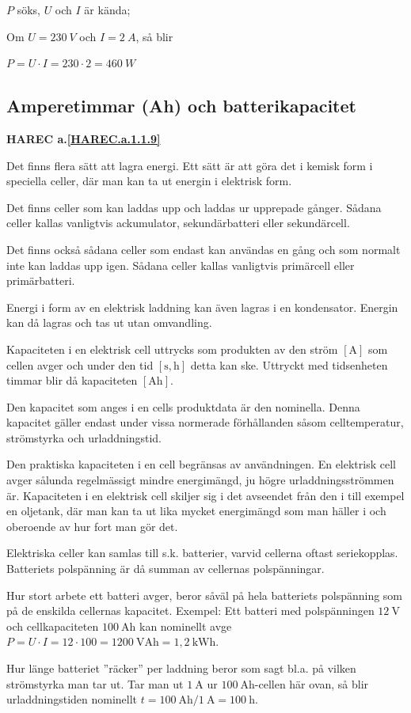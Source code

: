 \(P\) söks, \(U\) och \(I\) är kända;

Om \(U = 230\ V\) och \(I = 2\ A\), så blir

\(P = U \cdot I = 230 \cdot 2 = 460\ W\)

\subsection{Amperetimmar (Ah) och batterikapacitet}
\textbf{HAREC a.\ref{HAREC.a.1.1.9}\label{myHAREC.a.1.1.9}}

Det finns flera sätt att lagra energi.
Ett sätt är att göra det i kemisk form i speciella celler, där man kan ta ut
energin i elektrisk form.

Det finns celler som kan laddas upp och laddas ur upprepade gånger.
Sådana celler kallas vanligtvis ackumulator, sekundärbatteri eller
sekundärcell.

Det finns också sådana celler som endast kan användas en gång och som normalt
inte kan laddas upp igen.
Sådana celler kallas vanligtvis primärcell eller primärbatteri.

Energi i form av en elektrisk laddning kan även lagras i en kondensator.
Energin kan då lagras och tas ut utan omvandling.

Kapaciteten i en elektrisk cell uttrycks som produkten av den ström
\(\mathrm{[A]}\) som cellen avger och under den tid \(\mathrm{[s, h]}\) detta
kan ske.
Uttryckt med tidsenheten timmar blir då kapaciteten \(\mathrm{[Ah]}\).

Den kapacitet som anges i en cells produktdata är den nominella.
Denna kapacitet gäller endast under vissa normerade förhållanden såsom
celltemperatur, strömstyrka och urladdningstid.

Den praktiska kapaciteten i en cell begränsas av användningen.
En elektrisk cell avger sålunda regelmässigt mindre energimängd, ju högre
urladdningsströmmen är.
Kapaciteten i en elektrisk cell skiljer sig i det avseendet från den i
till exempel en oljetank, där man kan ta ut lika mycket energimängd som man häller i
och oberoende av hur fort man gör det.

Elektriska celler kan samlas till s.k. batterier, varvid cellerna oftast
seriekopplas.
Batteriets polspänning är då summan av cellernas polspänningar.

Hur stort arbete ett batteri avger, beror såväl på hela batteriets
polspänning som på de enskilda cellernas kapacitet.
Exempel:
Ett batteri med polspänningen \(12\ \mathrm{V}\) och cellkapaciteten
\(100\ \mathrm{Ah}\) kan nominellt avge
\(P = U \cdot I = 12 \cdot 100 = 1200\ \mathrm{VAh} = 1,2\ \mathrm{kWh}\).

Hur länge batteriet ''räcker'' per laddning beror som sagt bl.a. på vilken
strömstyrka man tar ut.
Tar man ut \(1\ \mathrm{A}\) ur \(100\ \mathrm{Ah}\)-cellen här ovan, så blir
urladdningstiden nominellt
\(t = 100\ \mathrm{Ah}/1\ \mathrm{A} = 100\ \mathrm{h}\).
